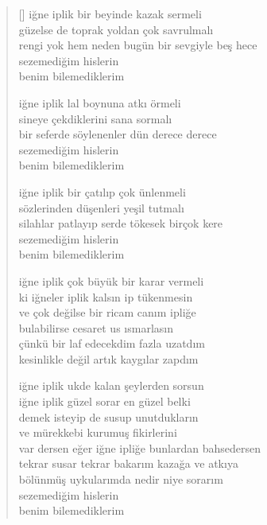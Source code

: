 \documentclass[10pt, openright, twoside]{memoir}
\theoremstyle{definition}
\begin{document}
\begin{verse}[\versewidth]
  iğne iplik bir beyinde kazak sermeli \\
  güzelse de toprak yoldan çok savrulmalı \\
  rengi yok hem neden bugün bir sevgiyle beş hece \\
  sezemediğim hislerin \\
  benim bilemediklerim

  iğne iplik lal boynuna atkı örmeli \\
  sineye çekdiklerini sana sormalı \\
  bir seferde söylenenler dün derece derece \\
  sezemediğim hislerin \\
  benim bilemediklerim

  iğne iplik bir çatılıp çok ünlenmeli \\
  sözlerinden düşenleri yeşil tutmalı \\
  silahlar patlayıp serde tökesek birçok kere \\
  sezemediğim hislerin \\
  benim bilemediklerim

  iğne iplik çok büyük bir karar vermeli \\
  ki iğneler iplik kalsın ip tükenmesin \\
  ve çok değilse bir ricam canım ipliğe \\
  bulabilirse cesaret us ısmarlasın \\
  çünkü bir laf edecekdim fazla uzatdım \\
  kesinlikle değil artık kaygılar zapdım

  iğne iplik ukde kalan şeylerden sorsun \\
  iğne iplik güzel sorar en güzel belki \\
  demek isteyip de susup unutdukların \\
  ve mürekkebi kurumuş fikirlerini \\
  var dersen eğer iğne ipliğe bunlardan bahsedersen \\
  tekrar susar tekrar bakarım kazağa ve atkıya \\
  bölünmüş uykularımda nedir niye sorarım \\
  sezemediğim hislerin \\
  benim bilemediklerim \\
\end{verse}
\vspace*{\fill}
%
\newpage
{}
\vspace*{\fill}
\end{document}
